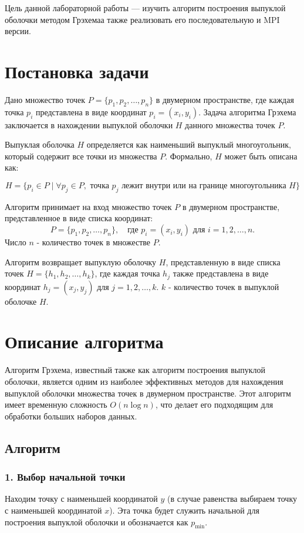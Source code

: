 \documentclass[12pt]{article}
\begin{document}
Цель данной лабораторной работы — изучить алгоритм построения выпуклой оболочки методом Грэхемаа также реализовать его последовательную и MPI версии.

\newpage

\section{Постановка задачи}
Дано множество точек \( P = \{ p_1, p_2, \ldots, p_n \} \) в двумерном пространстве, где каждая точка \( p_i \) представлена в виде координат \( p_i = (x_i, y_i) \). Задача алгоритма Грэхема заключается в нахождении выпуклой оболочки \( H \) данного множества точек \( P \).

Выпуклая оболочка \( H \) определяется как наименьший выпуклый многоугольник, который содержит все точки из множества \( P \). Формально, \( H \) может быть описана как:

\[
H = \{ p_i \in P \mid \forall p_j \in P, \text{ точка } p_j \text{ лежит внутри или на границе многоугольника } H \}
\]

Алгоритм принимает на вход множество точек \( P \) в двумерном пространстве, представленное в виде списка координат:
\[
    P = \{ p_1, p_2, \ldots, p_n \}, \quad \text{где } p_i = (x_i, y_i) \text{ для } i = 1, 2, \ldots, n.
\]
    Число \( n \) - количество точек в множестве \( P \).

Алгоритм возвращает выпуклую оболочку \( H \), представленную в виде списка точек \( H = \{ h_1, h_2, \ldots, h_k \} \), где каждая точка \( h_j \) также представлена в виде координат \( h_j = (x_j, y_j) \) для \( j = 1, 2, \ldots, k \). \( k \) - количество точек в выпуклой оболочке \( H \).

\section{Описание алгоритма}
Алгоритм Грэхема, известный также как алгоритм построения выпуклой оболочки, является одним из наиболее эффективных методов для нахождения выпуклой оболочки множества точек в двумерном пространстве. Этот алгоритм имеет временную сложность \(O(n \log n)\), что делает его подходящим для обработки больших наборов данных.

\subsection*{Алгоритм}

\subsubsection*{1. Выбор начальной точки}
Находим точку с наименьшей координатой \(y\) (в случае равенства выбираем точку с наименьшей координатой \(x\)). Эта точка будет служить начальной для построения выпуклой оболочки и обозначается как \(p_{\text{min}}\).
\end{document}
